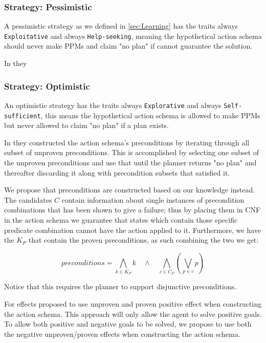 \documentclass[../Master.tex]{subfiles}
\begin{document}
\subsubsection{Strategy: Pessimistic}

	A pessimistic strategy as we defined in \ref{sec:Learning} has the traits always \texttt{Exploitative} and always \texttt{Help-seeking}, 
	meaning the hypothetical action schema should never make PPMs and claim "no plan" if cannot guarantee the solution.
	
	In \cite{Walsh2008} they 
	
\subsubsection{Strategy: Optimistic}

	An optimistic strategy has the traits always \texttt{Explorative} and always \texttt{Self-sufficient}, 
	this means the hypothetical action schema is allowed to make PPMs but never allowed to claim "no plan" if a plan exists.
	
	In \cite{Walsh2008} they constructed the action schema's preconditions by iterating through all subset of unproven preconditions. 
	This is accomplished by selecting one subset of the unproven preconditions and use that until the planner returns "no plan" and thereafter discarding it along with precondition subsets that satisfied it.

	We propose that preconditions are constructed based on our knowledge instead. 
	The candidates $C$ contain information about single instances of precondition combinations that has been shown to give a failure;
	thus by placing them in CNF in the action schema we guarantee that states which contain those specific predicate combination cannot have the action applied to it.
	Furthermore, we have the $K_P$ that contain the proven preconditions, as such combining the two we get:
	
	\begin{equation}
		preconditions = \bigwedge\limits_{k \in K_P} k \quad \land \quad  \bigwedge \limits_{c \in C_P} \left( \bigvee \limits_{p \in c} p\right)
	\end{equation}
	
	Notice that this requires the planner to support disjunctive preconditions.
	
	For effects \cite{Walsh2008} proposed to use unproven and proven positive effect when constructing the action schema. This approach will only allow the agent to solve positive goals.
	To allow both positive and negative goals to be solved, we propose to use both the negative unproven/proven effects when constructing the action schema.
		
\end{document}

